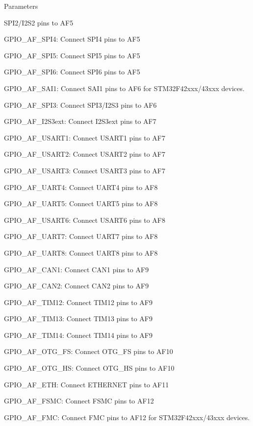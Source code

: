\begin{DoxyParams}{Parameters}
\begin{DoxyItemize}
S\+P\+I2/\+I2\+S2 pins to A\+F5 \item G\+P\+I\+O\+\_\+\+A\+F\+\_\+\+S\+P\+I4\+: Connect S\+P\+I4 pins to A\+F5 \item G\+P\+I\+O\+\_\+\+A\+F\+\_\+\+S\+P\+I5\+: Connect S\+P\+I5 pins to A\+F5 \item G\+P\+I\+O\+\_\+\+A\+F\+\_\+\+S\+P\+I6\+: Connect S\+P\+I6 pins to A\+F5 \item G\+P\+I\+O\+\_\+\+A\+F\+\_\+\+S\+A\+I1\+: Connect S\+A\+I1 pins to A\+F6 for S\+T\+M32\+F42xxx/43xxx devices. ~\newline
 \item G\+P\+I\+O\+\_\+\+A\+F\+\_\+\+S\+P\+I3\+: Connect S\+P\+I3/\+I2\+S3 pins to A\+F6 \item G\+P\+I\+O\+\_\+\+A\+F\+\_\+\+I2\+S3ext\+: Connect I2\+S3ext pins to A\+F7 \item G\+P\+I\+O\+\_\+\+A\+F\+\_\+\+U\+S\+A\+R\+T1\+: Connect U\+S\+A\+R\+T1 pins to A\+F7 \item G\+P\+I\+O\+\_\+\+A\+F\+\_\+\+U\+S\+A\+R\+T2\+: Connect U\+S\+A\+R\+T2 pins to A\+F7 \item G\+P\+I\+O\+\_\+\+A\+F\+\_\+\+U\+S\+A\+R\+T3\+: Connect U\+S\+A\+R\+T3 pins to A\+F7 \item G\+P\+I\+O\+\_\+\+A\+F\+\_\+\+U\+A\+R\+T4\+: Connect U\+A\+R\+T4 pins to A\+F8 \item G\+P\+I\+O\+\_\+\+A\+F\+\_\+\+U\+A\+R\+T5\+: Connect U\+A\+R\+T5 pins to A\+F8 \item G\+P\+I\+O\+\_\+\+A\+F\+\_\+\+U\+S\+A\+R\+T6\+: Connect U\+S\+A\+R\+T6 pins to A\+F8 \item G\+P\+I\+O\+\_\+\+A\+F\+\_\+\+U\+A\+R\+T7\+: Connect U\+A\+R\+T7 pins to A\+F8 \item G\+P\+I\+O\+\_\+\+A\+F\+\_\+\+U\+A\+R\+T8\+: Connect U\+A\+R\+T8 pins to A\+F8 \item G\+P\+I\+O\+\_\+\+A\+F\+\_\+\+C\+A\+N1\+: Connect C\+A\+N1 pins to A\+F9 \item G\+P\+I\+O\+\_\+\+A\+F\+\_\+\+C\+A\+N2\+: Connect C\+A\+N2 pins to A\+F9 \item G\+P\+I\+O\+\_\+\+A\+F\+\_\+\+T\+I\+M12\+: Connect T\+I\+M12 pins to A\+F9 \item G\+P\+I\+O\+\_\+\+A\+F\+\_\+\+T\+I\+M13\+: Connect T\+I\+M13 pins to A\+F9 \item G\+P\+I\+O\+\_\+\+A\+F\+\_\+\+T\+I\+M14\+: Connect T\+I\+M14 pins to A\+F9 \item G\+P\+I\+O\+\_\+\+A\+F\+\_\+\+O\+T\+G\+\_\+\+FS\+: Connect O\+T\+G\+\_\+\+FS pins to A\+F10 \item G\+P\+I\+O\+\_\+\+A\+F\+\_\+\+O\+T\+G\+\_\+\+HS\+: Connect O\+T\+G\+\_\+\+HS pins to A\+F10 \item G\+P\+I\+O\+\_\+\+A\+F\+\_\+\+E\+TH\+: Connect E\+T\+H\+E\+R\+N\+ET pins to A\+F11 \item G\+P\+I\+O\+\_\+\+A\+F\+\_\+\+F\+S\+MC\+: Connect F\+S\+MC pins to A\+F12 \item G\+P\+I\+O\+\_\+\+A\+F\+\_\+\+F\+MC\+: Connect F\+MC pins to A\+F12 for S\+T\+M32\+F42xxx/43xxx devices. ~\newline

\end{DoxyItemize}
\end{DoxyParams}
